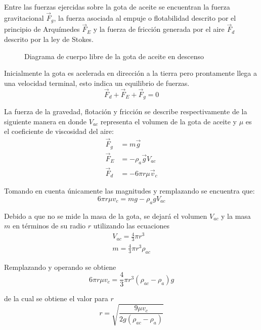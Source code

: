 Entre las fuerzas ejercidas sobre la gota de aceite se encuentran la fuerza
gravitacional $\Vec{F}_g$, la fuerza asociada al empuje o flotabilidad descrito
por el principio de Arquímedes $\Vec{F}_E$ y la fuerza de fricción generada
por el aire $\Vec{F}_d$ descrito por la ley de Stokes.

\begin{figure}[htbp!]
    \centering
    \caption{Diagrama de cuerpo libre de la gota de aceite en descenso}
    \label{fig:fbd-falling-drop}
\end{figure}

Inicialmente la gota es acelerada en dirección a la tierra pero prontamente
llega a una velocidad terminal, esto indica un equilibrio de fuerzas.
\begin{equation}
    \vec{F}_d + \vec{F}_E + \vec{F}_g = 0
\end{equation}

La fuerza de la gravedad, flotación y fricción se describe respectivamente de
la siguiente manera en donde $V_{ac}$ representa el volumen de la gota de
aceite y $\mu$ es el coeficiente de viscosidad del aire:
\begin{align}
    \vec{F}_g &= m\vec{g} \\
    \vec{F}_E &= -\rho_a \vec{g}V_{ac} \\
    \vec{F}_d &= -6\pi r\mu \vec{v}_c
\end{align}

Tomando en cuenta únicamente las magnitudes y remplazando se encuentra que:
\begin{equation}
    6\pi r\mu v_c = mg-\rho_a g V_{ac}
\end{equation}

Debido a que no se mide la masa de la gota, se dejará el volumen $V_{ac}$ y la
masa $m$ en términos de su radio $r$ utilizando las ecuaciones
\begin{align}
    V_{ac} = \frac{4}{3}\pi r^3\\
    m = \frac{4}{3}\pi r^3\rho_{ac}
\end{align}

Remplazando y operando se obtiene
\begin{equation}
    6\pi r\mu v_c = \frac{4}{3}\pi r^3(\rho_{ac}-\rho_a)g
\end{equation}

de la cual se obtiene el valor para $r$
\begin{equation}\label{eq:radius}
    r = \sqrt{\frac{9\mu v_c}{2g(\rho_{ac}-\rho_a)}}
\end{equation}

